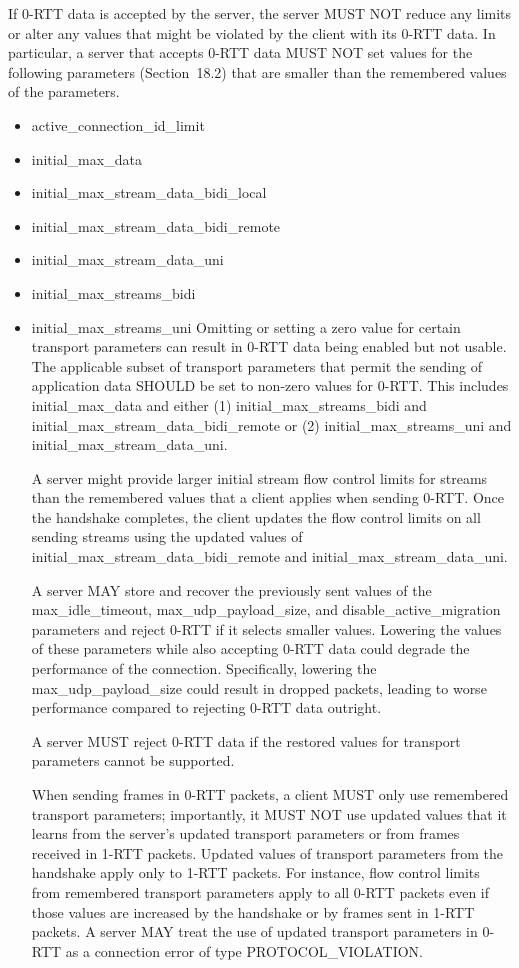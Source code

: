 \documentclass{article}
\begin{document}
If 0-RTT data is accepted by the server, the server MUST NOT reduce any limits or alter any values that might be violated by the client with its 0-RTT data.  In particular, a server that accepts 0-RTT data MUST NOT set values for the following parameters (Section~18.2) that are smaller than the remembered values of the parameters.

\begin{itemize}
\item active\_connection\_id\_limit
\item initial\_max\_data
\item initial\_max\_stream\_data\_bidi\_local
\item initial\_max\_stream\_data\_bidi\_remote
\item initial\_max\_stream\_data\_uni
\item initial\_max\_streams\_bidi
\item initial\_max\_streams\_uni
Omitting or setting a zero value for certain transport parameters can result in 0-RTT data being enabled but not usable.  The applicable subset of transport parameters that permit the sending of application data SHOULD be set to non-zero values for 0-RTT.  This includes initial\_max\_data and either (1) initial\_max\_streams\_bidi and initial\_max\_stream\_data\_bidi\_remote or (2) initial\_max\_streams\_uni and initial\_max\_stream\_data\_uni.

A server might provide larger initial stream flow control limits for streams than the remembered values that a client applies when sending 0-RTT.  Once the handshake completes, the client updates the flow control limits on all sending streams using the updated values of initial\_max\_stream\_data\_bidi\_remote and initial\_max\_stream\_data\_uni.

A server MAY store and recover the previously sent values of the max\_idle\_timeout, max\_udp\_payload\_size, and disable\_active\_migration parameters and reject 0-RTT if it selects smaller values.  Lowering the values of these parameters while also accepting 0-RTT data could degrade the performance of the connection.  Specifically, lowering the max\_udp\_payload\_size could result in dropped packets, leading to worse performance compared to rejecting 0-RTT data outright.

A server MUST reject 0-RTT data if the restored values for transport parameters cannot be supported.

When sending frames in 0-RTT packets, a client MUST only use remembered transport parameters; importantly, it MUST NOT use updated values that it learns from the server's updated transport parameters or from frames received in 1-RTT packets.  Updated values of transport parameters from the handshake apply only to 1-RTT packets. For instance, flow control limits from remembered transport parameters apply to all 0-RTT packets even if those values are increased by the handshake or by frames sent in 1-RTT packets.  A server MAY treat the use of updated transport parameters in 0-RTT as a connection error of type PROTOCOL\_VIOLATION.

\end{itemize}
\end{document}
